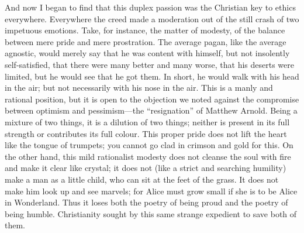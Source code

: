 And now I began to find that this duplex passion was the Christian key to ethics everywhere. Everywhere the creed made a moderation out of the still crash of two impetuous emotions. Take, for instance, the matter of modesty, of the balance between mere pride and mere prostration. The average pagan, like the average agnostic, would merely say that he was content with himself, but not insolently self-satisfied, that there were many better and many worse, that his deserts were limited, but he would see that he got them. In short, he would walk with his head in the air; but not necessarily with his nose in the air. This is a manly and rational position, but it is open to the objection we noted against the compromise between optimism and pessimism—the “resignation” of Matthew Arnold. Being a mixture of two things, it is a dilution of two things; neither is present in its full strength or contributes its full colour. This proper pride does not lift the heart like the tongue of trumpets; you cannot go clad in crimson and gold for this. On the other hand, this mild rationalist modesty does not cleanse the soul with fire and make it clear like crystal; it does not (like a strict and searching humility) make a man as a little child, who can sit at the feet of the grass. It does not make him look up and see marvels; for Alice must grow small if she is to be Alice in Wonderland. Thus it loses both the poetry of being proud and the poetry of being humble. Christianity sought by this same strange expedient to save both of them.

